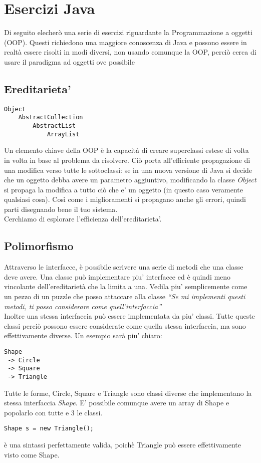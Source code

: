 \documentclass{article}
\begin{document}
\section*{Esercizi Java}
Di seguito elecherò una serie di esercizi riguardante la Programmazione a
oggetti (OOP). Questi richiedono una maggiore conoscenza di Java e
possono essere in realtà essere risolti in modi diversi, non usando comunque la
OOP, perciò cerca di usare il paradigma ad oggetti ove possibile

\subsection*{Ereditarieta'}
\begin{verbatim}
Object
    AbstractCollection
        AbstractList
            ArrayList
\end{verbatim}
Un elemento chiave della OOP è la capacità di creare superclassi estese di
volta in volta in base al problema da risolvere. Ciò porta all'efficiente
propagazione di una modifica verso tutte le sottoclassi: se in una nuova
versione di Java si decide che un oggetto debba avere un parametro aggiuntivo,
modificando la classe \textit{Object} si propaga la modifica a tutto ciò che e'
un oggetto (in questo caso veramente qualsiasi cosa). Così come i miglioramenti
si propagano anche gli errori, quindi parti disegnando bene il tuo sistema. \\
Cerchiamo di esplorare l'efficienza dell'ereditarieta'.

\subsection*{Polimorfismo}
Attraverso le interfacce, è possibile scrivere una serie di metodi che una
classe deve avere. Una classe può implementare piu' interfacce ed è quindi
meno vincolante dell'ereditarietà che la limita a una. Vedila piu'
semplicemente come un pezzo di un puzzle che posso attaccare alla classe
\textit{``Se mi implementi questi metodi, ti posso considerare come
quell'interfaccia''} \\
Inoltre una stessa interfaccia può essere implementata da piu' classi. Tutte
queste classi perciò possono essere considerate come quella stessa interfaccia,
ma sono effettivamente diverse. Un esempio sarà piu' chiaro:
\begin{verbatim}
Shape
 -> Circle
 -> Square
 -> Triangle
\end{verbatim}
Tutte le forme, Circle, Square e Triangle sono classi diverse che implementano
la stessa interfaccia \textit{Shape}. E' possibile comunque avere un array di
Shape e popolarlo con tutte e 3 le classi.
\begin{verbatim}
Shape s = new Triangle();
\end{verbatim}
è una sintassi perfettamente valida, poichè Triangle può essere
effettivamente visto come Shape.
\end{document}
